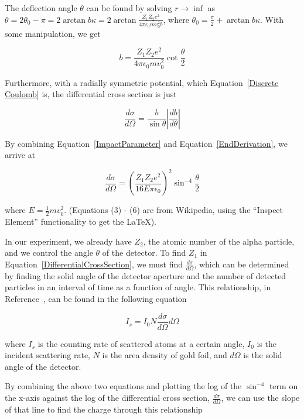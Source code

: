 The deflection angle $\theta$ can be found by solving $r \to \inf$ as $\theta=2\theta_{0}-\pi=2\arctan b\kappa=2\arctan\frac{Z_{1}Z_{2}e^{2}}{4\pi\epsilon_{0}mv_{0}^{2}b}$, where $\theta_{0}=\frac{\pi}{2}+\arctan b\kappa$. With some manipulation, we get 

\begin{equation}
b=\frac{Z_{1}Z_{2}e^{2}}{4\pi\epsilon_{0}mv_{0}^{2}}\cot\frac{\theta}{2}
\label{ImpactParameter}
\end{equation}

Furthermore, with a radially symmetric potential, which Equation~\ref{Discrete Coulomb} is, the differential cross section is just 

\begin{equation}
\frac{d\sigma}{d\Omega} = \frac{b}{\sin{\theta}} \left|\frac{db}{d\theta}\right|
\label{EndDerivation}
\end{equation}

By combining Equation~\ref{ImpactParameter} and Equation~\ref{EndDerivation}, we arrive at

\begin{equation}
  \frac{d\sigma}{d\Omega}=\left  (\frac{Z_1Z_2e^2}{16E \pi \epsilon_0} \right )^2\sin^{-4}{\frac{\theta}{2}}
  \label{DifferentialCrossSection}
\end{equation}    

where $E = \frac{1}{2} m v_0^{2}$. (Equations (3) - (6) are from Wikipedia, using the ``Inspect Element'' functionality to get the LaTeX).

In our experiment, we already have $Z_2$, the atomic number of the alpha particle, and we control the angle $\theta$ of the detector. To find $Z_1$ in Equation~\ref{DifferentialCrossSection}, we must find $\frac{d\sigma}{d\Omega}$, which can be determined by finding the solid angle of the detector aperture and the number of detected particles in an interval of time as a function of angle. This relationship, in Reference~\cite{Melissinos}, can be found in the following equation

\begin{equation}
  I_s = I_0 N \frac{d\sigma}{d\Omega} d\Omega
  \label{NumberOfAlphasScattered}
\end{equation}   

where $I_s$ is the counting rate of scattered atoms at a certain angle, $I_0$ is the incident scattering rate, $N$ is the area density of gold foil, and $d\Omega$ is the solid angle of the detector. 

By combining the above two equations and plotting the log of the $\sin^{-4}$ term on the x-axis against the log of the differential cross section, $\frac{d\sigma}{d\Omega}$, we can use the slope of that line to find the charge through this relationship

